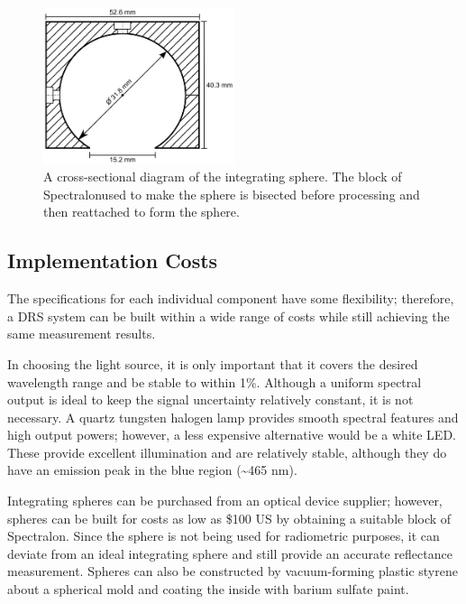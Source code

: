\begin{figure}
	\centering \includegraphics[width=0.5\textwidth]{figures/p1-intsphere_schematic.png}
	\caption[Cross-sectional diagram of the integrating sphere]{\label{fig:p1-intsphere_schematic}A cross-sectional diagram of the integrating sphere. The block of Spectralon\textregistered used to make the sphere is bisected before processing and then reattached to form the sphere.}
\end{figure}

\subsection{Implementation Costs}
The specifications for each individual component have some flexibility; therefore, a DRS system can be built within a wide range of costs while still achieving the same measurement results.

In choosing the light source, it is only important that it covers the desired wavelength range and be stable to within 1\%. Although a uniform spectral output is ideal to keep the signal uncertainty relatively constant, it is not necessary. A quartz tungsten halogen lamp provides smooth spectral features and high output powers; however, a less expensive alternative would be a white LED. These provide excellent illumination and are relatively stable, although they do have an emission peak in the blue region (\textasciitilde465 nm).

Integrating spheres can be purchased from an optical device supplier; however, spheres can be built for costs as low as \$100 US by obtaining a suitable block of Spectralon. Since the sphere is not being used for radiometric purposes, it can deviate from an ideal integrating sphere and still provide an accurate reflectance measurement. Spheres can also be constructed by vacuum-forming plastic styrene about a spherical mold and coating the inside with barium sulfate paint.\cite{Glennie2009}

